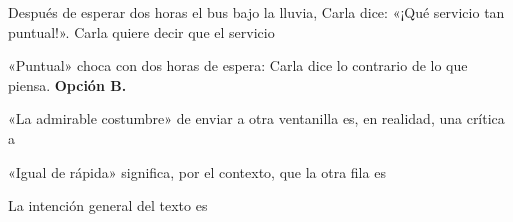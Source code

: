 \begin{reto}
Después de esperar dos horas el bus bajo la lluvia, Carla dice: «¡Qué servicio tan puntual!». Carla quiere decir que el
servicio
\end{reto}

\begin{retoresuelto}
«Puntual» choca con dos horas de espera: Carla dice lo contrario de lo que piensa. \textbf{Opción B.}
\end{retoresuelto}

\taller
{}
\begin{ejercicios}
\item «La admirable costumbre» de enviar a otra ventanilla  es, en realidad, una crítica a
\item «Igual de rápida»  significa, por el contexto, que la otra fila es
\item La intención general del texto es
\end{ejercicios}

\bitacora

